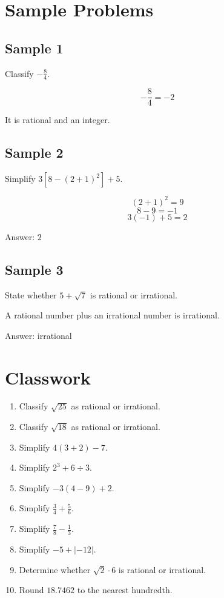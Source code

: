 \documentclass[11pt]{book}
\begin{document}
\section{Sample Problems}

\subsection{Sample 1}

Classify \(-\frac{8}{4}\).

\[-\frac{8}{4}=-2\]

It is rational and an integer.

\subsection{Sample 2}

Simplify \(3[8-(2+1)^2]+5\).

\[(2+1)^2=9\]
\[8-9=-1\]
\[3(-1)+5=2\]

Answer: \(2\)

\subsection{Sample 3}

State whether \(5+\sqrt7\) is rational or irrational.

A rational number plus an irrational number is irrational.

Answer: irrational

\section{Classwork}

\begin{enumerate}
\item Classify \(\sqrt{25}\) as rational or irrational.
\item Classify \(\sqrt{18}\) as rational or irrational.
\item Simplify \(4(3+2)-7\).
\item Simplify \(2^3+6\div3\).
\item Simplify \(-3(4-9)+2\).
\item Simplify \(\frac{3}{4}+\frac{5}{6}\).
\item Simplify \(\frac{7}{8}-\frac{1}{3}\).
\item Simplify \(-5+|-12|\).
\item Determine whether \(\sqrt2\cdot 6\) is rational or irrational.
\item Round \(18.7462\) to the nearest hundredth.
\end{enumerate}
\end{document}

